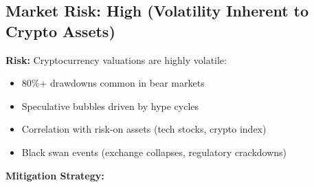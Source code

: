 \documentclass[11pt,a4paper]{article}
\begin{document}
\subsection{Market Risk: High (Volatility Inherent to Crypto Assets)}

\textbf{Risk:} Cryptocurrency valuations are highly volatile:
\begin{itemize}[leftmargin=*]
\item 80\%+ drawdowns common in bear markets
\item Speculative bubbles driven by hype cycles
\item Correlation with risk-on assets (tech stocks, crypto index)
\item Black swan events (exchange collapses, regulatory crackdowns)
\end{itemize}

\textbf{Mitigation Strategy:}
\end{document}
